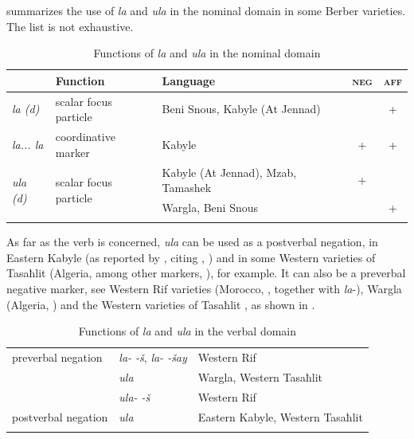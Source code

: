 \documentclass[output=paper,colorlinks,citecolor=brown]{langscibook}
\begin{document}
 summarizes the use of \textit{la} and \textit{ula} in the nominal domain in some Berber varieties. The list is not exhaustive.


\begin{table}\small
\begin{tabularx}{\textwidth}{llXcc}
\lsptoprule
& Function & Language & \textsc{neg} & \textsc{aff} \\
\midrule
{\itshape la (d)} & scalar focus particle & Beni Snous, Kabyle (At Jennad) &  &  +\\
{\itshape la... la} & coordinative marker & Kabyle &  + & +\\
\midrule
\multirow{2}{*}{\itshape ula (d)} & \multirow{2}{*}{scalar focus particle} & Kabyle (At Jennad), Mzab, Tamashek & + & \\
&  & Wargla, Beni Snous &  & +\\
\lspbottomrule
\end{tabularx}
\caption{Functions of \textit{la} and \textit{ula} in the nominal domain}
\label{tab:siw:1}
\end{table}

\newpage

As far as the verb is concerned, \textit{ula} can be used as a postverbal negation, in Eastern Kabyle (as reported by \citealt[403--404]{Brugnatelli2010}, citing \citealt{Rahmani1939}, \citealt{Rabhi1992}) and in some Western varieties of Tasaħlit (Algeria, among other markers, \citealt[28]{Garaoun2019}), for example. It can also be a preverbal negative marker, see Western Rif varieties (Morocco, \citealt[234--235]{Lafkioui2007}, together with \textit{la}{}-), Wargla (Algeria, \citealt[126--132]{Biarnay1908}) and the Western varieties of Tasaħlit \citep[28]{Garaoun2019}, as shown in .

\begin{table}
\begin{tabularx}{.95\textwidth}{lll}
    \lsptoprule
    preverbal negation & \textit{la{}- -š}, \textit{la{}- -šay} & Western Rif \\
    & {\itshape ula} & Wargla, Western Tasaħlit \\
    & {\itshape ula{}- -š} & Western Rif \\
    \midrule
    postverbal negation & {\itshape ula} & Eastern Kabyle, Western Tasaħlit \\
    \lspbottomrule
\end{tabularx}
\caption{Functions of \textit{la} and \textit{ula} in the verbal domain}
\label{tab:siw:2}
\end{table}
\end{document}
